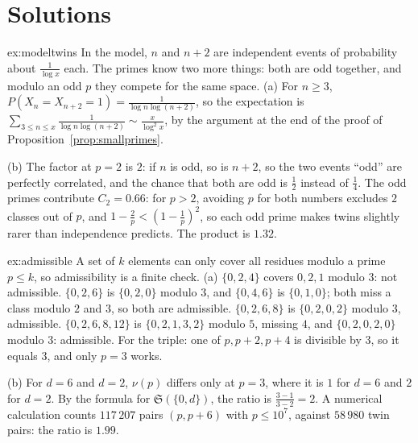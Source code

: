 \section{Solutions}

\begin{solution}{ex:modeltwins}
\idea In the model, $n$ and $n+2$ are independent events of probability about $\frac1{\log x}$ each. The primes know two more things: both are odd together, and modulo an odd $p$ they compete for the same space.
\writeup (a) For $n\ge3$, $P(X_n=X_{n+2}=1)=\frac1{\log n\log(n+2)}$, so the expectation is $\sum_{3\le n\le x}\frac1{\log n\log(n+2)}\sim\frac x{\log^2x}$, by the argument at the end of the proof of
Proposition~\ref{prop:smallprimes}.

(b) The factor at $p=2$ is $2$: if $n$ is odd, so is $n+2$, so the two events ``odd'' are perfectly correlated, and the chance that both are odd is $\frac12$ instead of $\frac14$. The odd primes contribute
$C_2=0.66$: for $p>2$, avoiding $p$ for both numbers excludes $2$ classes out of $p$, and $1-\frac2p<(1-\frac1p)^2$, so each odd prime makes twins slightly rarer than independence predicts. The product is $1.32$.
\end{solution}

\begin{solution}{ex:admissible}
\idea A set of $k$ elements can only cover all residues modulo a prime $p\le k$, so admissibility is a finite check.
\writeup (a) $\{0,2,4\}$ covers $0,2,1$ modulo $3$: not admissible. $\{0,2,6\}$ is $\{0,2,0\}$ modulo $3$, and $\{0,4,6\}$ is $\{0,1,0\}$; both miss a class modulo $2$ and $3$, so both are admissible.
$\{0,2,6,8\}$ is $\{0,2,0,2\}$ modulo $3$, admissible. $\{0,2,6,8,12\}$ is $\{0,2,1,3,2\}$ modulo $5$, missing $4$, and $\{0,2,0,2,0\}$ modulo $3$: admissible. For the triple: one of $p,p+2,p+4$ is divisible by $3$,
so it equals $3$, and only $p=3$ works.

(b) For $d=6$ and $d=2$, $\nu(p)$ differs only at $p=3$, where it is $1$ for $d=6$ and $2$ for $d=2$. By the formula for $\mathfrak S(\{0,d\})$, the ratio is $\frac{3-1}{3-2}=2$. A numerical calculation counts $117\,207$
pairs $(p,p+6)$ with $p\le10^7$, against $58\,980$ twin pairs: the ratio is $1.99$.
\end{solution}

